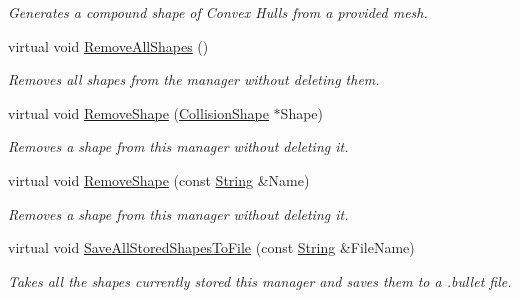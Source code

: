 \begin{DoxyCompactItemize}
\begin{DoxyCompactList}\small\item\em Generates a compound shape of Convex Hulls from a provided mesh. \item\end{DoxyCompactList}\item 
\hypertarget{classMezzanine_1_1CollisionShapeManager_a0911f693b819bb1c32ef401893a47d1b}{
virtual void \hyperlink{classMezzanine_1_1CollisionShapeManager_a0911f693b819bb1c32ef401893a47d1b}{RemoveAllShapes} ()}
\label{classMezzanine_1_1CollisionShapeManager_a0911f693b819bb1c32ef401893a47d1b}

\begin{DoxyCompactList}\small\item\em Removes all shapes from the manager without deleting them. \item\end{DoxyCompactList}\item 
virtual void \hyperlink{classMezzanine_1_1CollisionShapeManager_a4b44e43059e853243bbe27c25be088ca}{RemoveShape} (\hyperlink{classMezzanine_1_1CollisionShape}{CollisionShape} $\ast$Shape)
\begin{DoxyCompactList}\small\item\em Removes a shape from this manager without deleting it. \item\end{DoxyCompactList}\item 
virtual void \hyperlink{classMezzanine_1_1CollisionShapeManager_a53331ac80a2ad503c049cc212d496c94}{RemoveShape} (const \hyperlink{namespaceMezzanine_acf9fcc130e6ebf08e3d8491aebcf1c86}{String} \&Name)
\begin{DoxyCompactList}\small\item\em Removes a shape from this manager without deleting it. \item\end{DoxyCompactList}\item 
virtual void \hyperlink{classMezzanine_1_1CollisionShapeManager_a3adf0debfcef2c6ef4d2d6da1cd700f2}{SaveAllStoredShapesToFile} (const \hyperlink{namespaceMezzanine_acf9fcc130e6ebf08e3d8491aebcf1c86}{String} \&FileName)
\begin{DoxyCompactList}\small\item\em Takes all the shapes currently stored this manager and saves them to a .bullet file. \item\end{DoxyCompactList}\item 

\end{DoxyCompactItemize}
